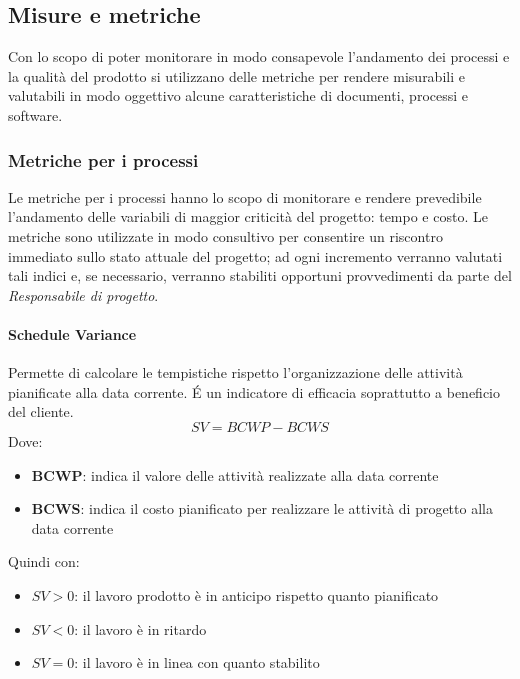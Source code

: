 \subsection{Misure e metriche}
Con lo scopo di poter monitorare in modo consapevole l'andamento dei
processi e la qualità del prodotto si utilizzano delle metriche per
rendere misurabili e valutabili in modo oggettivo alcune
caratteristiche di documenti, processi e software.


\subsubsection{Metriche per i processi}
Le metriche per i processi hanno lo scopo  di monitorare e rendere
prevedibile l’andamento delle variabili di maggior criticità del
progetto: tempo e costo. Le metriche sono utilizzate in modo consultivo
per consentire un riscontro immediato sullo stato attuale del
progetto; ad ogni incremento verranno valutati tali indici e, se
necessario, verranno stabiliti opportuni provvedimenti da parte del  \emph{Responsabile di progetto}.

\paragraph{Schedule Variance}
Permette di calcolare le tempistiche rispetto l'organizzazione delle attività pianificate alla data
corrente. \'E un indicatore di efficacia soprattutto a beneficio del
cliente.
$$
SV = BCWP − BCWS
$$
Dove:
\begin{itemize}
\item \textbf{BCWP}: indica il valore delle attività realizzate alla data corrente
\item \textbf{BCWS}: indica il costo pianificato per realizzare le attività di progetto alla data corrente
\end{itemize}
Quindi con:
\begin{itemize}
\item $SV>0$: il lavoro prodotto è in anticipo rispetto quanto pianificato
\item $SV<0$: il lavoro è in ritardo
\item $SV=0$: il lavoro è in linea con quanto stabilito
\end{itemize}

